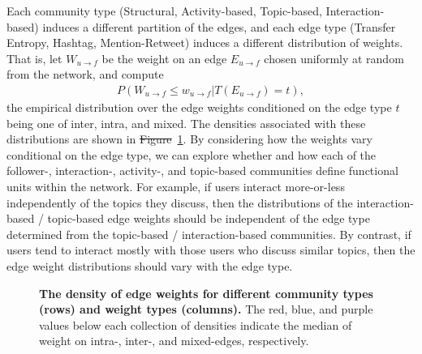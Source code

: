 \documentclass[10pt,letterpaper]{article}
\providecommand{\DIFadd}[1]{{\protect\color{blue}\uwave{#1}}} %
\providecommand{\DIFdel}[1]{{\protect\color{red}\sout{#1}}}                      %
\providecommand{\DIFaddbegin}{} %
\providecommand{\DIFaddend}{} %
\providecommand{\DIFdelbegin}{} %
\providecommand{\DIFdelend}{} %
\begin{document}
Each community type (Structural, Activity-based, Topic-based, Interaction-based) induces a different partition of the edges, and each edge type (Transfer Entropy, Hashtag, Mention-Retweet) induces a different distribution of weights. That is, let $W_{u \to f}$ be the weight on an edge $E_{u \to f}$ chosen uniformly at random from the network, and compute
\begin{align}
	P(W_{u \to f} \leq w_{u \to f} | T(E_{u \to f}) = t),
\end{align}
the empirical distribution over the edge weights conditioned on the edge type $t$ being one of inter, intra, and mixed. The densities associated with these distributions are shown in \DIFdelbegin \DIFdel{Figure}\DIFdelend \DIFaddbegin \DIFadd{Fig.}\DIFaddend ~\ref{Fig-distributions_by_types}. By considering how the weights vary conditional on the edge type, we can explore whether and how each of the follower-, interaction-, activity-, and topic-based communities define functional units within the network. For example, if users interact more-or-less independently of the topics they discuss, then the distributions of the interaction-based / topic-based edge weights should be independent of the edge type determined from the topic-based / interaction-based communities. By contrast, if users tend to interact mostly with those users who discuss similar topics, then the edge weight distributions should vary with the edge type.
\begin{figure}[!h]
	\centering
	\caption{\textbf{The density of edge weights for different community types (rows) and weight types (columns).} The red,  blue, and purple values below each collection of densities indicate the median of weight on intra-, inter-, and mixed-edges, respectively.}
	\label{Fig-distributions_by_types}
\end{figure}
\end{document}
